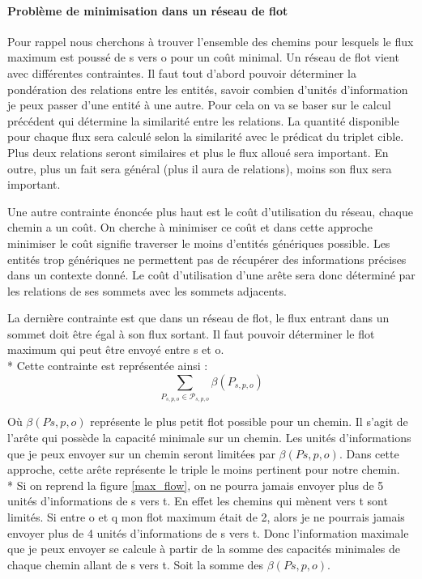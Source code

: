 \paragraph{Problème de minimisation dans un réseau de flot}

Pour rappel nous cherchons à trouver l'ensemble des chemins pour lesquels le flux maximum est poussé de s vers o pour un coût minimal. Un réseau de flot vient avec différentes contraintes. Il faut tout d'abord pouvoir déterminer la pondération des relations entre les entités, savoir combien d'unités d'information je peux passer d'une entité à une autre. Pour cela on va se baser sur le calcul précédent qui détermine la similarité entre les relations. La quantité disponible pour chaque flux sera calculé selon la similarité avec le prédicat du triplet cible. Plus deux relations seront similaires et plus le flux alloué sera important. En outre, plus un fait sera général (plus il aura de relations), moins son flux sera important.

Une autre contrainte énoncée plus haut est le coût d'utilisation du réseau, chaque chemin a un coût. On cherche à minimiser ce coût et dans cette approche minimiser le coût signifie traverser le moins d'entités génériques possible. Les entités trop génériques ne permettent pas de récupérer des informations précises dans un contexte donné. Le coût d'utilisation d'une arête sera donc déterminé par les relations de ses sommets avec les sommets adjacents.

La dernière contrainte est que dans un réseau de flot, le flux entrant dans un sommet doit être égal à son flux sortant. Il faut pouvoir déterminer le flot maximum qui peut être envoyé entre s et o.
\\*
Cette contrainte est représentée ainsi :
\begin{equation}
   \sum\limits_{P_{s,p,o}  \in  \mathcal{P}_{s,p,o}}  \beta(P_{s,p,o})
\end{equation}

Où $ \beta(P s,p,o) $ représente le plus petit flot possible pour un chemin. Il s'agit de l'arête qui possède la capacité minimale sur un chemin. Les unités d'informations que je peux envoyer sur un chemin seront limitées par $ \beta(P s,p,o) $. Dans cette approche, cette arête représente le triple le moins pertinent pour notre chemin.
\\*
Si on reprend la figure \ref{max_flow}, on ne pourra jamais envoyer plus de 5 unités d'informations de s vers t. En effet les chemins qui mènent vers t sont limités. Si entre o et q mon flot maximum était de 2, alors je ne pourrais jamais envoyer plus de 4 unités d'informations de s vers t. Donc l'information maximale que je peux envoyer se calcule à partir de la somme des capacités minimales de chaque chemin allant de s vers t. Soit la somme des $ \beta(P s,p,o) $.


